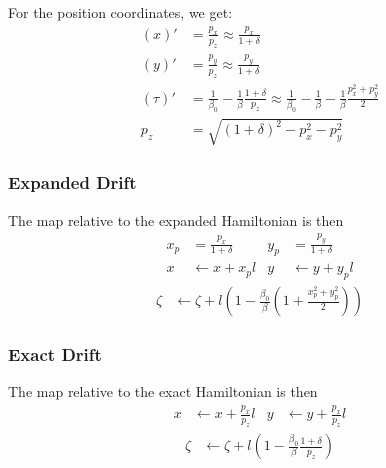 For the position coordinates, we get:
\begin{align}
  \left(x\right)' &=
        \frac{p_x}{p_z}
        \approx \frac{p_x}{1+\delta} \\
  \left(y\right)' &=
        \frac{p_y}{p_z}
        \approx \frac{p_y}{1+\delta} \\
  \left(\tau\right)' &=
        \frac{1}{\beta_0} - \frac{1}{\beta}\frac{1+\delta}{p_z}
        \approx \frac{1}{\beta_0} - \frac{1}{\beta} - \frac{1}{\beta}
                \frac{p_x^2 + p_y^2}{2} \\
  p_z &=
        \sqrt{(1+\delta)^2 - p_x^2 - p_y^2}
\end{align}



\subsubsection{Expanded Drift}

The map relative to the expanded Hamiltonian is then
\begin{align}
  x_p &= \frac{p_x}{1+\delta} & 
  y_p &= \frac{p_y}{1+\delta}  \\
  x & \leftarrow x + x_p l &
  y & \leftarrow y + y_p l
\end{align}
\begin{align}
  \zeta &
    \leftarrow \zeta+
    l\left(1- \frac{\beta_0}{\beta}\left(1 + \frac{x_p^2+y_p^2}{2}\right)\right)
\end{align}

\subsubsection{Exact Drift}

The map relative to the exact Hamiltonian is then
\begin{align}
  x & \leftarrow x + \frac{p_x}{p_z} l  &
  y & \leftarrow y + \frac{p_x}{p_z} l
\end{align}
\begin{align}
  \zeta & \leftarrow \zeta + l\left(
          1-\frac{\beta_0}{\beta}\frac{1+\delta}{p_z}
          \right)
\end{align}




